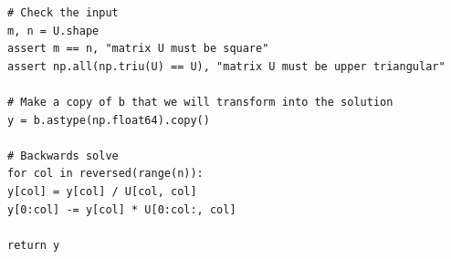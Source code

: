 \documentclass[11pt]{article}
\begin{document}
\begin{enumerate}
\begin{lstlisting}
# Check the input
m, n = U.shape
assert m == n, "matrix U must be square"
assert np.all(np.triu(U) == U), "matrix U must be upper triangular"

# Make a copy of b that we will transform into the solution
y = b.astype(np.float64).copy()

# Backwards solve
for col in reversed(range(n)):
y[col] = y[col] / U[col, col]
y[0:col] -= y[col] * U[0:col:, col]

return y
\end{lstlisting}
\end{enumerate}
\end{document}
